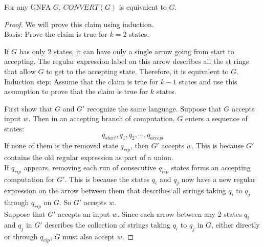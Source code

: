 \documentclass[11pt,a4paper]{article}
\begin{document}
\begin{claim}
    For any GNFA $G$, $CONVERT(G)$ is equivalent to $G$. \\

    \begin{proof}
        We will prove this claim using induction. \\

        Basis: Prove the claim is true for $k=2$ states.

        If $G$ has only 2 states, it can have only a single arrow going from start to accepting.
        The regular expression label on this arrow describes all the st rings that allow $G$ to get to the accepting state.
        Therefore, it is equivalent to $G$. \\

        Induction step: Assume that the claim is true for $k-1$ states and use this assumption to prove that the claim is true for $k$ states.

        First show that $G$ and $G'$ recognize the same language. Suppose that $G$ accepts input $w$. Then in an accepting branch of computation, $G$ enters a sequence of states: $$q_{start},q_1,q_2,\cdots,q_{accept}$$
        If none of them is the removed state $q_{rip}$, then $G'$ accepts $w$. This is because $G'$ contains the old regular expression as part of a union. \\

        If $q_{rip}$ appears, removing each run of consecutive $q_{rip}$ states forms an accepting computation for $G'$.
        This is because the states $q_i$ and $q_j$ now have a new regular expression on the arrow between them that describes all strings taking $q_i$ to $q_j$ through $q_{rip}$ on $G$. So $G'$ accepts $w$. \\

        Suppose that $G'$ accepts an input $w$. Since each arrow between any 2 states $q_i$ and $q_j$ in $G'$ describes the collection of strings taking $q_i$ to $q_j$ in $G$, either directly or through $q_{rip}$, $G$ must also accept $w$.
    \end{proof}
\end{claim}

\begin{example}
\end{example}



\end{document}
